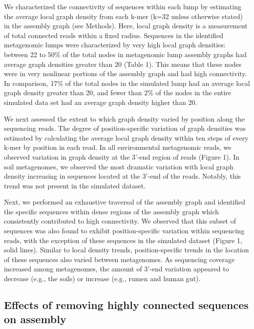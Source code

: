 \documentclass[10pt]{article}
\begin{document}
We characterized the connectivity of sequences
within each lump by estimating the average local graph density from
each k-mer (k=32 unless otherwise stated) in the assembly graph (see
Methods).  Here, local graph density is a measurement of total
connected reads within a fixed radius.  Sequences
in the identified metagenomic lumps were characterized by very high
local graph densities: between 22 to 50\% of the total nodes in
metagenomic lump assembly graphs had average graph densities greater
than 20 (Table 1).  This means that these nodes were in very nonlinear portions of the assembly graph and had high connectivity.  In comparison, 17\% of the total nodes in the
simulated lump had an average local graph density greater than 20, and
fewer than 2\% of the nodes in the entire simulated data set had an
average graph density higher than 20.

We next assessed the extent to which graph density varied by position
along the sequencing reads.  The degree of position-specific variation of
graph densities was estimated by calculating the average local graph
density within ten steps of every k-mer by position in each read.  In
all environmental metagenomic reads, we observed variation in graph
density at the 3'-end region of reads (Figure 1).  In soil
metagenomes, we observed the most dramatic variation with local graph
density increasing in sequences located at the 3'-end of the reads.
Notably, this trend was not present in the simulated dataset.

Next, we performed an exhaustive traversal of the assembly graph and
identified the specific sequences within dense regions of the assembly
graph which consistently contributed to high connectivity.  We
observed that this subset of sequences was also found to exhibit
position-specific variation within sequencing reads, with the
exception of these sequences in the simulated dataset (Figure 1, solid
lines).  Similar to local density trends, position-specific trends in
the location of these sequences also varied between metagenomes.  As
sequencing coverage increased among metagenomes, the amount of 3'-end
variation appeared to decrease (e.g., the soils) or increase (e.g.,
rumen and human gut).

\subsection*{Effects of removing highly connected sequences on assembly}
\end{document}
